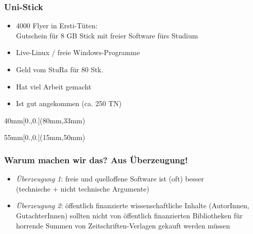 \documentclass{beamer}
\begin{document}
\begin{frame}[label=ct1b,t]
  \frametitle{Uni-Stick}

  \vspace{-5mm}

  \begin{itemize}
  \item 4000 Flyer in Ersti-Tüten:\\
    Gutschein für 8 GB Stick mit freier Software fürs Studium
  \item Live-Linux / freie Windows-Programme
  \item Geld vom StuRa für 80 Stk.
    \pause
  \item Hat viel Arbeit gemacht
    \pause
  \item Ist gut angekommen (ca. 250 TN)
  \end{itemize}

  \begin{textblock*}{40mm}[0.,0.](80mm,33mm)
  \end{textblock*}

  \begin{textblock*}{55mm}[0.,0.](15mm,50mm)
  \end{textblock*}

\end{frame}

\begin{frame}[label=ct2]
  \frametitle{Warum machen wir das? Aus Überzeugung!}

  \onslide<+->

  \begin{itemize}
  \item \emph{Überzeugung 1}: freie und quelloffene Software ist (oft) besser\\
    (technische + nicht technische Argumente)\\
    \bigskip\onslide<+->
  \item \emph{Überzeugung 2}: öffentlich finanzierte wissenschaftliche Inhalte
    (AutorInnen, GutachterInnen) sollten nicht von öffentlich finanzierten
    Bibliotheken für horrende Summen von Zeitschriften-Verlagen gekauft werden
    müssen
  \end{itemize}
\end{frame}
\end{document}
